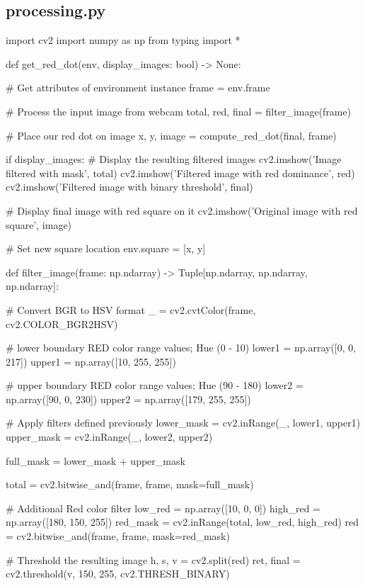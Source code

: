 \subsection{processing.py}
\label{processing}
\begin{pyverbatim}
import cv2
import numpy as np
from typing import *


def get_red_dot(env, display_images: bool) -> None:

    # Get attributes of environment instance
    frame = env.frame

    # Process the input image from webcam
    total, red, final = filter_image(frame)

    # Place our red dot on image
    x, y, image = compute_red_dot(final, frame)

    if display_images:
        # Display the resulting filtered images
        cv2.imshow('Image filtered with mask', total)
        cv2.imshow('Filtered image with red dominance', red)
        cv2.imshow('Filtered image with binary threshold', final)

    # Display final image with red square on it
    cv2.imshow('Original image with red square', image)

    # Set new square location
    env.square = [x, y]


def filter_image(frame: np.ndarray) -> Tuple[np.ndarray, np.ndarray, np.ndarray]:

    # Convert BGR to HSV format
    _ = cv2.cvtColor(frame, cv2.COLOR_BGR2HSV)

    # lower boundary RED color range values; Hue (0 - 10)
    lower1 = np.array([0, 0, 217])
    upper1 = np.array([10, 255, 255])

    # upper boundary RED color range values; Hue (90 - 180)
    lower2 = np.array([90, 0, 230])
    upper2 = np.array([179, 255, 255])

    # Apply filters defined previously
    lower_mask = cv2.inRange(_, lower1, upper1)
    upper_mask = cv2.inRange(_, lower2, upper2)

    full_mask = lower_mask + upper_mask

    total = cv2.bitwise_and(frame, frame, mask=full_mask)

    # Additional Red color filter
    low_red = np.array([10, 0, 0])
    high_red = np.array([180, 150, 255])
    red_mask = cv2.inRange(total, low_red, high_red)
    red = cv2.bitwise_and(frame, frame, mask=red_mask)

    # Threshold the resulting image
    h, s, v = cv2.split(red)
    ret, final = cv2.threshold(v, 150, 255, cv2.THRESH_BINARY)


\end{pyverbatim}
